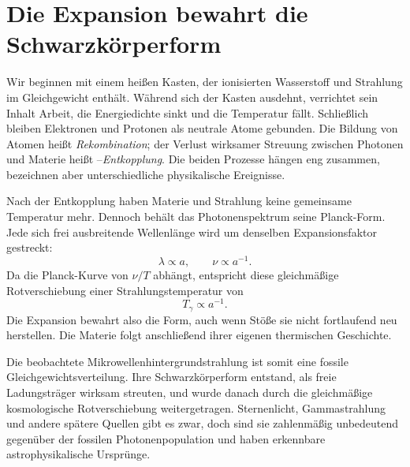 \section{Die Expansion bewahrt die Schwarzkörperform}

Wir beginnen mit einem heißen Kasten, der ionisierten Wasserstoff und Strahlung im Gleichgewicht enthält. Während sich der Kasten ausdehnt, verrichtet sein Inhalt Arbeit, die Energiedichte sinkt und die Temperatur fällt. Schließlich bleiben Elektronen und Protonen als neutrale Atome gebunden. Die Bildung von Atomen heißt \emph{Rekombination}; der Verlust wirksamer Streuung zwischen Photonen und Materie heißt --\emph{Entkopplung}. Die beiden Prozesse hängen eng zusammen, bezeichnen aber unterschiedliche physikalische Ereignisse.

Nach der Entkopplung haben Materie und Strahlung keine gemeinsame Temperatur mehr. Dennoch behält das Photonenspektrum seine Planck-Form. Jede sich frei ausbreitende Wellenlänge wird um denselben Expansionsfaktor gestreckt:
\begin{equation}
\lambda\propto a,
\qquad
\nu\propto a^{-1}.
\end{equation}
Da die Planck-Kurve von \(\nu/T\) abhängt, entspricht diese gleichmäßige Rotverschiebung einer Strahlungstemperatur von
\begin{equation}
\boxed{T_\gamma\propto a^{-1}.}
\label{eq:c07-temperature-scaling}
\end{equation}
Die Expansion bewahrt also die Form, auch wenn Stöße sie nicht fortlaufend neu herstellen. Die Materie folgt anschließend ihrer eigenen thermischen Geschichte.

Die beobachtete Mikrowellenhintergrundstrahlung ist somit eine fossile Gleichgewichtsverteilung. Ihre Schwarzkörperform entstand, als freie Ladungsträger wirksam streuten, und wurde danach durch die gleichmäßige kosmologische Rotverschiebung weitergetragen. Sternenlicht, Gammastrahlung und andere spätere Quellen gibt es zwar, doch sind sie zahlenmäßig unbedeutend gegenüber der fossilen Photonenpopulation und haben erkennbare astrophysikalische Ursprünge.

\begin{classroomqa}
\end{classroomqa}

